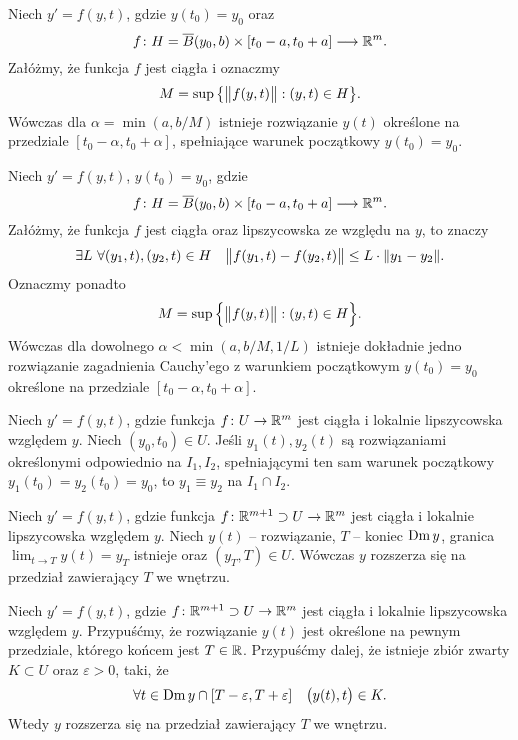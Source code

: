 
\begin{theorem}[Peano]
  Niech $y' = f(y,t)$, gdzie $y(t_0) = y_0$ oraz
  \[
    f \colon H = \overline{B} (y_0, b) \times [t_0 - a, t_0 + a] \longrightarrow \R^m.
  \]
  Załóżmy, że funkcja $f$ jest ciągła i oznaczmy
  \[
    M = \sup \big\{ \norm[\big]{f(y,t)} : (y, t) \in H \big\}.
  \]
  Wówczas dla $\alpha = \min(a, b/M)$ istnieje rozwiązanie $y(t)$ określone na
  przedziale $[t_0 - \alpha, t_0 + \alpha]$, spełniające warunek początkowy $y(t_0) = y_0$.
\end{theorem}

\begin{theorem}
  Niech $y' = f(y,t)$, $y(t_0) = y_0$, gdzie
  \[
    f \colon H = \overline{B} (y_0, b) \times [t_0 - a, t_0 + a] \longrightarrow \R^m.
  \]
  Załóżmy, że funkcja $f$ jest ciągła oraz lipszycowska ze względu na $y$, to znaczy
  \[
    \exists L \ \forall (y_1,t), (y_2,t) \in H \quad
    \norm[\big]{f(y_1,t) - f(y_2,t)} \leq L \cdot \norm{y_1 - y_2}.
  \]
  Oznaczmy ponadto
  \[
    M = \sup \Big\{ \norm[\big]{f(y,t)} : (y, t) \in H \Big\}.
  \]
  Wówczas dla dowolnego $\alpha < \min(a, b/M, 1/L)$ istnieje dokładnie jedno rozwiązanie
  zagadnienia Cauchy'ego z warunkiem początkowym $y(t_0) = y_0$ określone na przedziale
  $[t_0 - \alpha, t_0 + \alpha]$.
\end{theorem}

\begin{lemma}
  Niech $y' = f(y,t)$, gdzie funkcja $f \colon U \to \R^m$ jest ciągła i lokalnie lipszycowska
  względem $y$. Niech $(y_0,t_0) \in U$. Jeśli $y_1(t), y_2(t)$ są rozwiązaniami określonymi
  odpowiednio na $I_1, I_2$, spełniającymi ten sam warunek początkowy $y_1(t_0) = y_2(t_0) = y_0$,
  to $y_1 \equiv y_2$ na $I_1 \cap I_2$.
\end{lemma}

\begin{lemma}
  Niech $y' = f(y,t)$, gdzie funkcja $f \colon \R^{m+1} \supset U \to \R^m$ jest ciągła i lokalnie
  lipszycowska względem $y$. Niech $y(t)$ -- rozwiązanie, $T$ -- koniec $\Dm y$, granica
  $\lim_{t \to T} y(t) = y_T$ istnieje oraz $(y_T, T) \in U$. Wówczas $y$ rozszerza się na przedział
  zawierający $T$ we wnętrzu.
\end{lemma}

\begin{theorem}
  Niech $y' = f(y,t)$, gdzie $f \colon \R^{m+1} \supset U \to \R^m$ jest ciągła i lokalnie
  lipszycowska względem $y$. Przypuśćmy, że rozwiązanie $y(t)$ jest określone na pewnym przedziale,
  którego końcem jest $T \in \R$. Przypuśćmy dalej, że istnieje zbiór zwarty $K \subset U$ oraz
  $\varepsilon > 0$, taki, że
  \[
    \forall t \in \Dm y \cap [T - \varepsilon, T + \varepsilon] \quad \p[\big]{y(t), t} \in K.
  \]
  Wtedy $y$ rozszerza się na przedział zawierający $T$ we wnętrzu.
\end{theorem}

